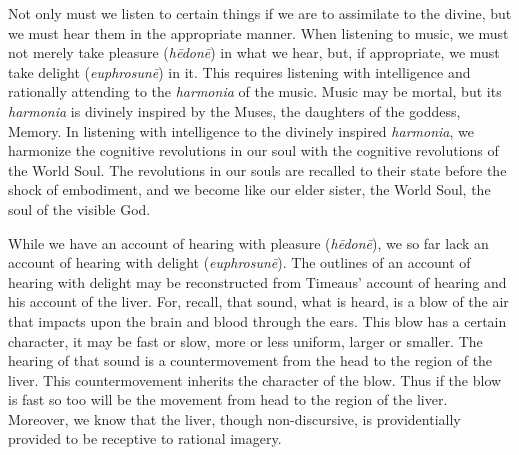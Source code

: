 Not only must we listen to certain things if we are to assimilate to the divine, but we must hear them in the appropriate manner. When listening to music, we must not merely take pleasure (\emph{hēdonē}) in what we hear, but, if appropriate, we must take delight (\emph{euphrosunē}) in it. This requires listening with intelligence and rationally attending to the \emph{harmonia} of the music. Music may be mortal, but its \emph{harmonia} is divinely inspired by the Muses, the daughters of the goddess, Memory. In listening with intelligence to the divinely inspired \emph{harmonia}, we harmonize the cognitive revolutions in our soul with the cognitive revolutions of the World Soul. The revolutions in our souls are recalled to their state before the shock of embodiment, and we become like our elder sister, the World Soul, the soul of the visible God. 

While we have an account of hearing with pleasure (\emph{hēdonē}), we so far lack an account of hearing with delight (\emph{euphrosunē}). The outlines of an account of hearing with delight may be reconstructed from Timeaus' account of hearing and his account of the liver. For, recall, that sound, what is heard, is a blow of the air that impacts upon the brain and blood through the ears. This blow has a certain character, it may be fast or slow, more or less uniform, larger or smaller. The hearing of that sound is a countermovement from the head to the region of the liver. This countermovement inherits the character of the blow. Thus if the blow is fast so too will be the movement from head to the region of the liver. Moreover, we know that the liver, though non-discursive, is providentially provided to be receptive to rational imagery. 

